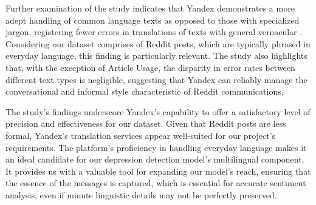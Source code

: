 Further examination of the study indicates that Yandex demonstrates a more adept handling of common language texts as opposed to those with specialized jargon, registering fewer errors in translations of texts with general vernacular \cite{cambedda2021study}. Considering our dataset comprises of Reddit posts, which are typically phrased in everyday language, this finding is particularly relevant. The study also highlights that, with the exception of Article Usage, the disparity in error rates between different text types is negligible, suggesting that Yandex can reliably manage the conversational and informal style characteristic of Reddit communications.

The study’s findings underscore Yandex's capability to offer a satisfactory level of precision and effectiveness for our dataset. Given that Reddit posts are less formal, Yandex's translation services appear well-suited for our project's requirements. The platform’s proficiency in handling everyday language makes it an ideal candidate for our depression detection model's multilingual component. It provides us with a valuable tool for expanding our model’s reach, ensuring that the essence of the messages is captured, which is essential for accurate sentiment analysis, even if minute linguistic details may not be perfectly preserved.